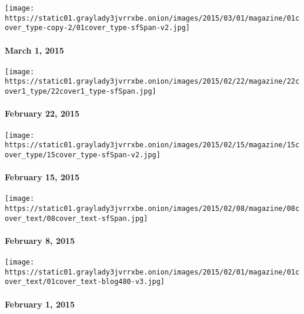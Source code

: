 \href{http://www.nytimes3xbfgragh.onion/indexes/2015/03/01/magazine/index.html}{}

\texttt{[image: https://static01.graylady3jvrrxbe.onion/images/2015/03/01/magazine/01cover\_type-copy-2/01cover\_type-sfSpan-v2.jpg]}

\hypertarget{march-1-2015}{%
\paragraph{March 1, 2015}\label{march-1-2015}}

\href{http://www.nytimes3xbfgragh.onion/indexes/2015/02/22/magazine/index.html}{}

\texttt{[image: https://static01.graylady3jvrrxbe.onion/images/2015/02/22/magazine/22cover1\_type/22cover1\_type-sfSpan.jpg]}

\hypertarget{february-22-2015}{%
\paragraph{February 22, 2015}\label{february-22-2015}}

\href{http://www.nytimes3xbfgragh.onion/indexes/2015/02/15/magazine/index.html}{}

\texttt{[image: https://static01.graylady3jvrrxbe.onion/images/2015/02/15/magazine/15cover\_type/15cover\_type-sfSpan-v2.jpg]}

\hypertarget{february-15-2015}{%
\paragraph{February 15, 2015}\label{february-15-2015}}

\href{http://www.nytimes3xbfgragh.onion/indexes/2015/02/08/magazine/index.html}{}

\texttt{[image: https://static01.graylady3jvrrxbe.onion/images/2015/02/08/magazine/08cover\_text/08cover\_text-sfSpan.jpg]}

\hypertarget{february-8-2015}{%
\paragraph{February 8, 2015}\label{february-8-2015}}

\href{http://www.nytimes3xbfgragh.onion/indexes/2015/02/01/magazine/index.html}{}

\texttt{[image: https://static01.graylady3jvrrxbe.onion/images/2015/02/01/magazine/01cover\_text/01cover\_text-blog480-v3.jpg]}

\hypertarget{february-1-2015}{%
\paragraph{February 1, 2015}\label{february-1-2015}}

